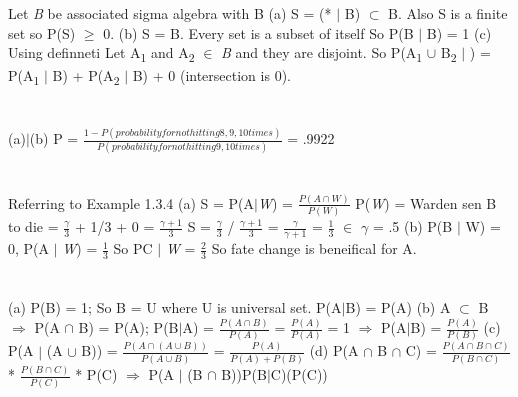 \documentclass{report}
\begin{document}
{	\section{}
	Let {\textit{B}} be associated sigma algebra with B
	{\newline}
	(a) S = (* {$\vert$} B) {$\subset$} B. Also S is a finite set so P(S) {$\geq$} 0.
	{\newline}
	(b) S = B. Every set is a subset of itself So P(B {$\vert$} B) = 1
	{\newline}
	(c) Using definneti Let A{\textsubscript{1}} and A{\textsubscript{2}} {$\in$} {\textit{B}} and they are disjoint. So P(A{\textsubscript{1}} {$\cup$} B{\textsubscript{2}} {$\vert$} ) = P(A{\textsubscript{1}} {$\vert$} B) + P(A{\textsubscript{2}} {$\vert$} B) + 0 (intersection is 0).
	{\newline}
	\section{}
	(a){$\vert$}(b) P = {$\frac{1 - P(probability for not hitting 8, 9, 10 times)}{P(probability for not hitting 9, 10 times)}$} = .9922
	\section{}
	Referring to Example 1.3.4
	{\newline}
	(a) S = P(A{$\vert$}{\textit{W}}) = {$\frac{P(A \cap {\textit{W}})}{P({\textit{W}})}$}
	P({\textit{W}}) = {Warden sen B to die} = {$\frac{\gamma}{3}$} + 1/3 + 0 = {$\frac{\gamma + 1}{3}$}
	{\newline}
	S = {$\frac{\gamma}{3}$} / {$\frac{\gamma + 1}{3}$} = {$\frac{\gamma}{\gamma + 1}$} = {$\frac{1}{3}$} {$\in$} {$\gamma$} = .5
	{\newline}
	(b) P(B {$\vert$} W) = 0, P(A {$\vert$} {\textit{W}}) = {$\frac{1}{3}$}
	So P{C {$\vert$} {\textit{W}}} = {$\frac{2}{3}$}
	So fate change is beneifical for A.
	{\newline}
	\section{}
	(a) P(B) = 1; So B = U where U is universal set. P(A{$\vert$}B) = P(A)
	{\newline}
	(b) A {$\subset$} B {$\Rightarrow$} P(A {$\cap$} B) = P(A); P(B{$\vert$}A) = {$\frac{P(A \cap B)}{P(A)}$} = {$\frac{P(A)}{P(A)}$} = 1 {$\Rightarrow$} P(A{$\vert$}B) = {$\frac{P(A)}{P(B)}$}
	{\newline}
	(c) P(A {$\vert$} (A $\cup$ B)) = {$\frac{P(A \cap (A \cup B))}{P(A \cup B)}$} = {$\frac{P(A)}{P(A) + P(B)}$}
	{\newline}
	(d) P(A {$\cap$} B {$\cap$} C) = {$\frac{P(A \cap B \cap C)}{P(B \cap C)}$} * {$\frac{P(B \cap C)}{P(C)}$} * P(C) {$\Rightarrow$} P(A {$\vert$} (B {$\cap$} B))P(B{$\vert$}C)(P(C))
	{\newline}
	
}
\end{document}
